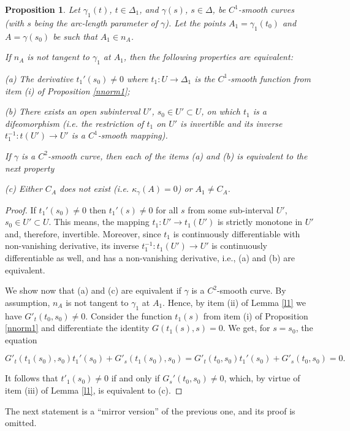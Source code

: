 \documentclass[a4paper,12pt]{amsart}
\newtheorem{prop}[thm]{Proposition}
\def\g{\gamma}
\begin{document}
\begin{prop}\label{nnorm2}
 Let $\g_1(t)$, $t \in \Delta_1$, and $\g(s)$,
 $s \in \Delta$, be  $C^1$-smooth curves (with  $s$ being the arc-length parameter of
 $\g$). Let the points $A_1= \g_1(t_0)$ and $A= \g(s_0)$ be such that $A_1 \in n_A$.

If $n_A$ is not tangent to $\g_1$  at $A_1$, then  the following properties are equivalent:

(a) The derivative $t_1'(s_0) \neq 0$ where
$t_1: U \rightarrow \Delta_1$ is the $C^1$-smooth function from item (i) of Proposition
\ref{nnorm1};

(b) There exists an open subinterval $U'$, $s_0 \in U'\subset U$, on which $t_1$ is a difeomorphism (i.e. the restriction of $t_1$ on $U'$ is invertible and its inverse $t_1^{-1}: t(U') \rightarrow U' $  is a  $C^1$-smooth mapping).

If $\g$ is a $C^2$-smooth curve, then each of the items (a) and (b) is equivalent to the next property

(c)  Either $C_A$ does not exist (i.e.
$\kappa_{\g}(A)=0$) or $A_1\neq C_A$.

\end{prop}
\begin{proof} If $t_1'(s_0) \neq 0$  then $t_1'(s) \neq 0$ for all $s$ from some sub-interval $U'$, $s_0 \in U'\subset U$. This means, the mapping $t_1:U' \to t_1(U')$ is strictly monotone in $U'$ and, therefore, invertible. Moreover, since $t_1$ is continuously differentiable with non-vanishing derivative, its inverse
$t_1^{-1}:t_1(U') \rightarrow U'$ is continuously differentiable as well, and has a non-vanishing derivative, i.e., (a) and (b) are equivalent.

We show now that (a) and (c) are equivalent if $\g$ is a $C^2$-smooth curve.
By assumption,
$n_A$ is not tangent to $\g_1$ at $A_1$. Hence, by item (ii) of Lemma \ref{l1} we have $G'_t(t_0,s_0) \neq 0$. Consider the function $t_1(s)$ from item (i) of Proposition \ref{nnorm1} and differentiate the identity  $G(t_1(s), s) =0$. We get, for $s=s_0$, the equation

\begin{equation}\label{9}
G'_t(t_1(s_0),s_0)t_1'(s_0) + G'_s(t_1(s_0),s_0)=G'_t(t_0,s_0)t_1'(s_0) + G'_s(t_0,s_0) = 0.
\end{equation}

It follows that $t'_1(s_0) \neq 0$ if and only if $G_s'(t_0,s_0) \neq 0$, which, by virtue of item (iii) of Lemma \ref{l1}, is equivalent to  (c).
\end{proof}
The next statement is a ``mirror version'' of the previous one, and its proof is omitted.
\end{document}
